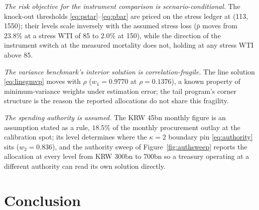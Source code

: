 \documentclass[11pt,a4paper]{article}
\begin{document}
\emph{The risk objective for the instrument comparison is scenario-conditional.} The knock-out thresholds \eqref{eq:pstar}--\eqref{eq:pbar} are priced on the stress ledger at (113, 1550); their levels scale inversely with the assumed stress loss ($\bar p$ moves from $23.8\%$ at a stress WTI of 85 to $2.0\%$ at 150), while the direction of the instrument switch at the measured mortality does not, holding at any stress WTI above 85.

\emph{The variance benchmark's interior solution is correlation-fragile.} The line solution \eqref{eq:linegmvp} moves with $\rho$ ($w_1=0.9770$ at $\rho=0.1376$), a known property of minimum-variance weights under estimation error; the tail program's corner structure is the reason the reported allocations do not share this fragility.

\emph{The spending authority is assumed.} The KRW 45bn monthly figure is an assumption stated as a rule, $18.5\%$ of the monthly procurement outlay at the calibration spot; its level determines where the $\kappa=2$ boundary pin \eqref{eq:authority} sits ($w_2=0.836$), and the authority sweep of Figure~\ref{fig:authsweep} reports the allocation at every level from KRW 300bn to 700bn so a treasury operating at a different authority can read its own solution directly.

\section{Conclusion}
\label{sec:conclusion}
\end{document}

